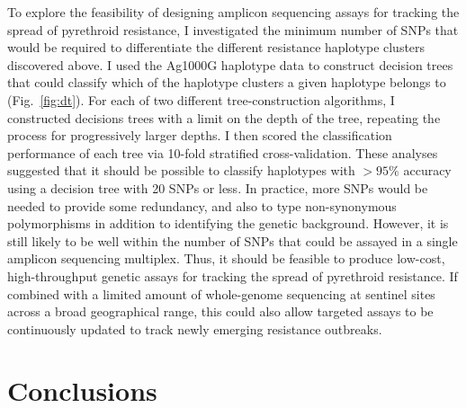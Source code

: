 \documentclass[a4paper,11pt,abstracton,hidelinks]{scrartcl}
\begin{document}
To explore the feasibility of designing amplicon sequencing assays for tracking the spread of pyrethroid resistance, I investigated the minimum number of SNPs that would be required to differentiate the different resistance haplotype clusters discovered above.
%
I used the Ag1000G haplotype data to construct decision trees that could classify which of the haplotype clusters a given haplotype belongs to (Fig.~\ref{fig:dt}).
%
For each of two different tree-construction algorithms, I constructed decisions trees with a limit on the depth of the tree, repeating the process for progressively larger depths.
%
I then scored the classification performance of each tree via 10-fold stratified cross-validation.
%
These analyses suggested that it should be possible to classify haplotypes with $>95\%$ accuracy using a decision tree with 20 SNPs or less.
%
In practice, more SNPs would be needed to provide some redundancy, and also to type non-synonymous polymorphisms in addition to identifying the genetic background.
%
However, it is still likely to be well within the number of SNPs that could be assayed in a single amplicon sequencing multiplex.
%
Thus, it should be feasible to produce low-cost, high-throughput genetic assays for tracking the spread of pyrethroid resistance.
%
If combined with a limited amount of whole-genome sequencing at sentinel sites across a broad geographical range, this could also allow targeted assays to be continuously updated to track newly emerging resistance outbreaks.



\section{Conclusions}\label{sec:conclusions}
\end{document}
